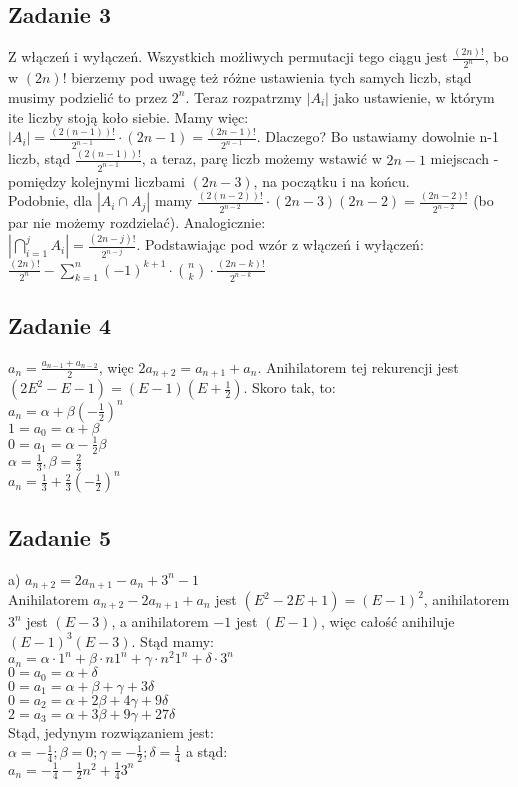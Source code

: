 \documentclass[a4paper]{article}
\begin{document}
\subsection*{Zadanie 3}
Z włączeń i wyłączeń. Wszystkich możliwych permutacji tego ciągu jest $\frac{(2n)!}{2^n}$, bo w $(2n)!$ bierzemy pod uwagę też różne ustawienia tych samych liczb, stąd musimy podzielić to przez $2^n$. Teraz rozpatrzmy $|A_i|$ jako ustawienie, w którym ite liczby stoją koło siebie. Mamy więc:\\
$|A_i|=\frac{(2(n-1))!}{2^{n-1}}\cdot (2n-1)=\frac{(2n-1)!}{2^{n-1}}$. Dlaczego? Bo ustawiamy dowolnie n-1 liczb, stąd $\frac{(2(n-1))!}{2^{n-1}}$, a teraz, parę liczb możemy wstawić w $2n-1$ miejscach - pomiędzy kolejnymi liczbami $(2n-3)$, na początku i na końcu.\\
Podobnie, dla $|A_i \cap A_j|$ mamy $\frac{(2(n-2))!}{2^{n-2}}\cdot (2n-3)(2n-2)=\frac{(2n-2)!}{2^{n-2}}$ (bo par nie możemy rozdzielać). Analogicznie:\\
$|\bigcap\limits_{i=1}^{j} A_i| = \frac{(2n-j)!}{2^{n-j}}$. Podstawiając pod wzór z włączeń i wyłączeń:\\
$\frac{(2n)!}{2^n} - \sum\limits_{k=1}^{n} (-1)^{k+1} \cdot {n \choose k} \cdot \frac{(2n-k)!}{2^{n-k}}$

\subsection*{Zadanie 4}
$a_n=\frac{a_{n-1}+a_{n-2}}{2}$, więc $2a_{n+2}=a_{n+1}+a_{n}$. Anihilatorem tej rekurencji jest $(2E^2-E-1)=(E-1)(E+\frac{1}{2})$. Skoro tak, to:\\
$ a_n = \alpha + \beta (-\frac{1}{2})^n$\\
$1=a_0=\alpha+\beta$\\
$0=a_1=\alpha-\frac{1}{2}\beta$\\
$\alpha=\frac{1}{3}, \beta=\frac{2}{3}$\\
$a_n=\frac{1}{3}+\frac{2}{3} (-\frac{1}{2})^n$ 

\clearpage
\subsection*{Zadanie 5}
a) $a_{n+2}=2a_{n+1}-a_n+3^n-1$\\
Anihilatorem $a_{n+2}-2a_{n+1}+a_n$ jest $(E^2-2E+1)=(E-1)^2$, anihilatorem $3^n$ jest $(E-3)$, a anihilatorem $-1$ jest $(E-1)$, więc całość anihiluje $(E-1)^3(E-3)$. Stąd mamy:\\
$a_n=\alpha \cdot 1^n + \beta \cdot n1^n + \gamma \cdot n^2 1^n + \delta \cdot 3^n$\\
$0 = a_0 = \alpha + \delta$\\
$0 = a_1 = \alpha + \beta + \gamma + 3 \delta $\\
$0 = a_2 = \alpha + 2 \beta + 4 \gamma + 9 \delta $\\
$2 = a_3 = \alpha + 3 \beta + 9 \gamma + 27 \delta $\\
Stąd, jedynym rozwiązaniem jest:\\
$\alpha = -\frac{1}{4}; \beta = 0; \gamma = - \frac{1}{2}; \delta = \frac{1}{4}$ a stąd:\\
$a_n= - \frac{1}{4} - \frac{1}{2} n^2 + \frac{1}{4} 3^n$
\end{document}
